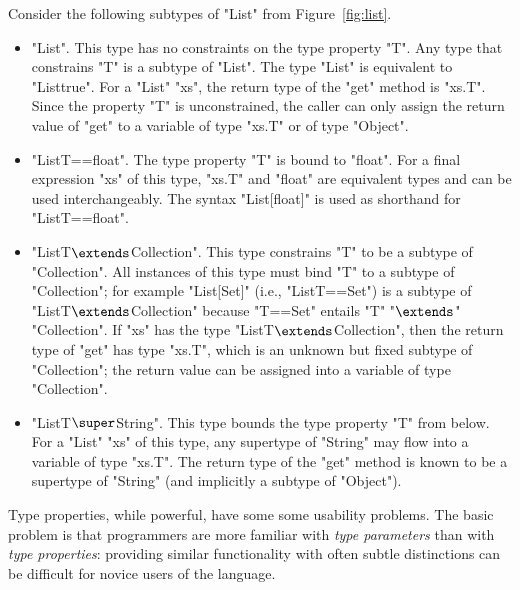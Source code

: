 Consider the following subtypes  of \xcd"List" from
Figure~\ref{fig:list}.
\begin{itemize}
\item \xcd"List".  This type has no constraints on the type
property \xcd"T".
Any type that constrains \xcd"T"
is a subtype of \xcd"List".  The type \xcd"List" is equivalent to
\xcd"List{true}".
%
For a \xcd"List" \xcd"xs", the return type of the \xcd"get" method
is \xcd"xs.T".
Since the property \xcd"T" is unconstrained,
the caller can only assign the return value of \xcd"get"
to a variable of type \xcd"xs.T" or of type \xcd"Object".

\item \xcd"List{T==float}".
The type property \xcd"T" is bound to \xcd"float".
For a final expression \xcd"xs" of this type,
\xcd"xs.T" and \xcd"float" are equivalent types and can be used
interchangeably.
The syntax \xcd"List[float]" is used as
shorthand for \xcd"List{T==float}".

\item \xcdmath"List{T$\extends$Collection}".
This type constrains \xcd"T" to be a subtype of \xcd"Collection".
All instances of this type must bind \xcd"T" to a subtype of
\xcd"Collection"; for example \xcd"List[Set]" (i.e.,
\xcd"List{T==Set}") is a subtype of
\xcdmath"List{T$\extends$Collection}" because \xcd"T==Set" entails
\xcdmath"T"
\xcdmath"$\extends$"
\xcdmath"Collection".
%
If \xcd"xs" has the type \xcdmath"List{T$\extends$Collection}",
then the return type of \xcd"get" has type \xcd"xs.T", which is an unknown but
fixed subtype of \xcd"Collection"; the return value can be
assigned into a variable of type \xcd"Collection".

\item \xcdmath"List{T$\super$String}".  This type bounds the type property
\xcd"T"
from below.  For a \xcd"List" \xcd"xs" of this type, any
supertype of \xcd"String" may flow into a variable of type \xcd"xs.T".
The return type of the \xcd"get"
method is known to be a
supertype of \xcd"String" (and implicitly a subtype of \xcd"Object").
\end{itemize}

\label{sec:usability}
\label{sec:parameters-vs-fields}

Type properties, while powerful, have some
some usability problems.
The basic
problem is that programmers are more familiar with
\emph{type parameters} than with \emph{type properties}:
providing similar functionality with often subtle distinctions
can be difficult for novice users of the language.

